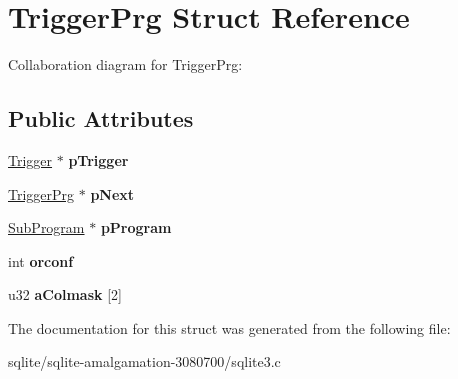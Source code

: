 \hypertarget{struct_trigger_prg}{\section{Trigger\+Prg Struct Reference}
\label{struct_trigger_prg}
}


Collaboration diagram for Trigger\+Prg\+:
\subsection*{Public Attributes}
\begin{DoxyCompactItemize}
\item 
\hypertarget{struct_trigger_prg_af70e5a74c954bc7a1eb8ee1162c40368}{\hyperlink{struct_trigger}{Trigger} $\ast$ {\bfseries p\+Trigger}}\label{struct_trigger_prg_af70e5a74c954bc7a1eb8ee1162c40368}

\item 
\hypertarget{struct_trigger_prg_a551b8a29a8c4ff785afab1596e5d8710}{\hyperlink{struct_trigger_prg}{Trigger\+Prg} $\ast$ {\bfseries p\+Next}}\label{struct_trigger_prg_a551b8a29a8c4ff785afab1596e5d8710}

\item 
\hypertarget{struct_trigger_prg_aa770aee270c7c5df85578dc4a6686134}{\hyperlink{struct_sub_program}{Sub\+Program} $\ast$ {\bfseries p\+Program}}\label{struct_trigger_prg_aa770aee270c7c5df85578dc4a6686134}

\item 
\hypertarget{struct_trigger_prg_aa475acda58c472b3491f6aa17020bf68}{int {\bfseries orconf}}\label{struct_trigger_prg_aa475acda58c472b3491f6aa17020bf68}

\item 
\hypertarget{struct_trigger_prg_aeac0a4cd1f1d287981ae33c4d171b614}{u32 {\bfseries a\+Colmask} \mbox{[}2\mbox{]}}\label{struct_trigger_prg_aeac0a4cd1f1d287981ae33c4d171b614}

\end{DoxyCompactItemize}


The documentation for this struct was generated from the following file\+:\begin{DoxyCompactItemize}
\item 
sqlite/sqlite-\/amalgamation-\/3080700/sqlite3.\+c\end{DoxyCompactItemize}
